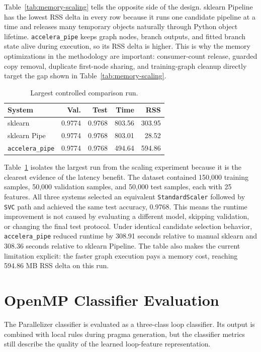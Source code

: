 \documentclass[12pt,a4paper,oneside]{report}
\begin{document}
Table~\ref{tab:memory-scaling} tells the opposite side of the design. sklearn Pipeline has the lowest RSS delta in every row because it runs one candidate pipeline at a time and releases many temporary objects naturally through Python object lifetime. \texttt{accelera\_pipe} keeps graph nodes, branch outputs, and fitted branch state alive during execution, so its RSS delta is higher. This is why the memory optimizations in the methodology are important: consumer-count release, guarded copy removal, duplicate first-node sharing, and training-graph cleanup directly target the gap shown in Table~\ref{tab:memory-scaling}.

\begin{table}[!htbp]
\centering
\caption{Largest controlled comparison run.}
\label{tab:controlled-comparison}
\normalsize
\renewcommand{\arraystretch}{1.05}
\setlength{\tabcolsep}{4pt}
\begin{tabular}{lrrrr}
\toprule
System & Val. & Test & Time & RSS \\
\midrule
sklearn & 0.9774 & 0.9768 & 803.56 & 303.95 \\
sklearn Pipe & 0.9774 & 0.9768 & 803.01 & 28.52 \\
\texttt{accelera\_pipe} & 0.9774 & 0.9768 & 494.64 & 594.86 \\
\bottomrule
\end{tabular}
\end{table}

Table~\ref{tab:controlled-comparison} isolates the largest run from the scaling experiment because it is the clearest evidence of the latency benefit. The dataset contained 150,000 training samples, 50,000 validation samples, and 50,000 test samples, each with 25 features. All three systems selected an equivalent \texttt{StandardScaler} followed by \texttt{SVC} path and achieved the same test accuracy, 0.9768. This means the runtime improvement is not caused by evaluating a different model, skipping validation, or changing the final test protocol. Under identical candidate selection behavior, \texttt{accelera\_pipe} reduced runtime by 308.91 seconds relative to manual sklearn and 308.36 seconds relative to sklearn Pipeline. The table also makes the current limitation explicit: the faster graph execution pays a memory cost, reaching 594.86 MB RSS delta on this run.

\section{OpenMP Classifier Evaluation}
The Parallelizer classifier is evaluated as a three-class loop classifier. Its output is combined with local rules during pragma generation, but the classifier metrics still describe the quality of the learned loop-feature representation.
\end{document}
